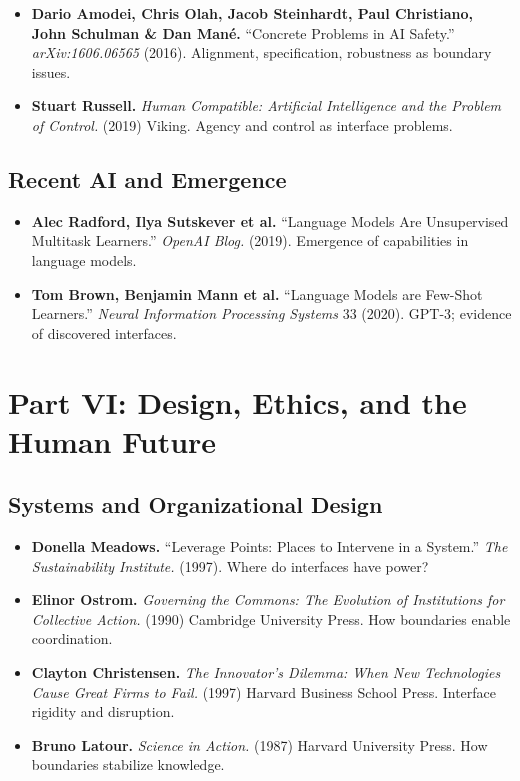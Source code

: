 \documentclass[
  openright]{book}
\begin{document}
\begin{itemize}
\item
  \textbf{Dario Amodei, Chris Olah, Jacob Steinhardt, Paul Christiano,
  John Schulman \& Dan Mané.} ``Concrete Problems in AI Safety.''
  \emph{arXiv:1606.06565} (2016). Alignment, specification, robustness
  as boundary issues.
\item
  \textbf{Stuart Russell.} \emph{Human Compatible: Artificial
  Intelligence and the Problem of Control.} (2019) Viking. Agency and
  control as interface problems.
\end{itemize}

\subsection{Recent AI and Emergence}\label{recent-ai-and-emergence}

\begin{itemize}
\item
  \textbf{Alec Radford, Ilya Sutskever et al.} ``Language Models Are
  Unsupervised Multitask Learners.'' \emph{OpenAI Blog.} (2019).
  Emergence of capabilities in language models.
\item
  \textbf{Tom Brown, Benjamin Mann et al.} ``Language Models are
  Few-Shot Learners.'' \emph{Neural Information Processing Systems} 33
  (2020). GPT-3; evidence of discovered interfaces.
\end{itemize}

\section{Part VI: Design, Ethics, and the Human
Future}\label{part-vi-design-ethics-and-the-human-future}

\subsection{Systems and Organizational
Design}\label{systems-and-organizational-design}

\begin{itemize}
\item
  \textbf{Donella Meadows.} ``Leverage Points: Places to Intervene in a
  System.'' \emph{The Sustainability Institute.} (1997). Where do
  interfaces have power?
\item
  \textbf{Elinor Ostrom.} \emph{Governing the Commons: The Evolution of
  Institutions for Collective Action.} (1990) Cambridge University
  Press. How boundaries enable coordination.
\item
  \textbf{Clayton Christensen.} \emph{The Innovator's Dilemma: When New
  Technologies Cause Great Firms to Fail.} (1997) Harvard Business
  School Press. Interface rigidity and disruption.
\item
  \textbf{Bruno Latour.} \emph{Science in Action.} (1987) Harvard
  University Press. How boundaries stabilize knowledge.
\end{itemize}
\end{document}
